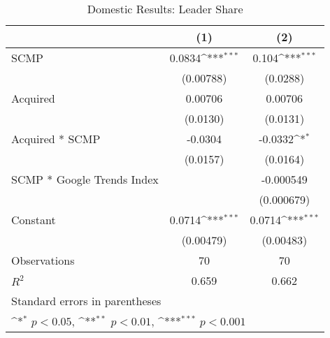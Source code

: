\begin{table}[htbp]\centering
\def\sym#1{\ifmmode^{#1}\else\(^{#1}\)\fi}
\caption{Domestic Results: Leader Share\label{leaddomestic}}
\begin{tabular*}{0.75\textwidth}{@{\hskip\tabcolsep\extracolsep\fill}l*{2}{c}}
\hline\hline
                &\multicolumn{1}{c}{(1)}         &\multicolumn{1}{c}{(2)}         \\
\hline
SCMP            &   0.0834\sym{***}&    0.104\sym{***}\\
                &(0.00788)         & (0.0288)         \\
[1em]
Acquired        &  0.00706         &  0.00706         \\
                & (0.0130)         & (0.0131)         \\
[1em]
Acquired * SCMP &  -0.0304         &  -0.0332\sym{*}  \\
                & (0.0157)         & (0.0164)         \\
[1em]
SCMP * Google Trends Index&                  &-0.000549         \\
                &                  &(0.000679)         \\
[1em]
Constant        &   0.0714\sym{***}&   0.0714\sym{***}\\
                &(0.00479)         &(0.00483)         \\
\hline
Observations    &       70         &       70         \\
\(R^{2}\)       &    0.659         &    0.662         \\
\hline\hline
\multicolumn{3}{l}{\footnotesize Standard errors in parentheses}\\
\multicolumn{3}{l}{\footnotesize \sym{*} \(p<0.05\), \sym{**} \(p<0.01\), \sym{***} \(p<0.001\)}\\
\end{tabular*}
\end{table}
